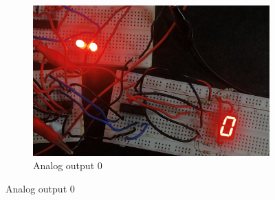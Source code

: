 \begin{figure}[H]
    \begin{subfigure}{\linewidth}
    \includegraphics[width=1\textwidth]{images/0.jpg}
    \caption{Analog output 0}
    \end{subfigure}
    

    
            
\end{figure}


